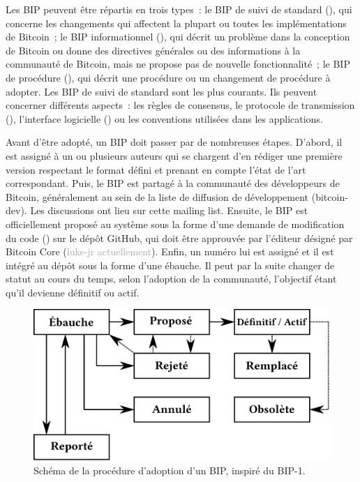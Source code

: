 Les BIP peuvent être répartis en trois types~: le BIP de suivi de standard (), qui concerne les changements qui affectent la plupart ou toutes les implémentations de Bitcoin~; le BIP informationnel (), qui décrit un problème dans la conception de Bitcoin ou donne des directives générales ou des informations à la communauté de Bitcoin, mais ne propose pas de nouvelle fonctionnalité~; le BIP de procédure (), qui décrit une procédure ou un changement de procédure à adopter. Les BIP de suivi de standard sont les plus courants. Ils peuvent concerner différents aspects~: les règles de consensus, le protocole de transmission (), l'interface logicielle () ou les conventions utilisées dans les applications.

Avant d'être adopté, un BIP doit passer par de nombreuses étapes. D'abord, il est assigné à un ou plusieurs auteurs qui se chargent d'en rédiger une première version respectant le format défini et prenant en compte l'état de l'art correspondant. Puis, le BIP est partagé à la communauté des développeurs de Bitcoin, généralement au sein de la liste de diffusion de développement (bitcoin-dev). Les discussions ont lieu sur cette mailing list. Ensuite, le BIP est officiellement proposé au système sous la forme d'une demande de modification du code () sur le dépôt GitHub, qui doit être approuvée par l'éditeur désigné par Bitcoin Core (\textcolor{darkgray}{luke-jr actuellement}). Enfin, un numéro lui est assigné et il est intégré au dépôt sous la forme d'une ébauche. Il peut par la suite changer de statut au cours du temps, selon l'adoption de la communauté, l'objectif étant qu'il devienne définitif ou actif.

\begin{figure}[h]
  \centering
  \includegraphics[scale=0.29]{img/bip-process-fr.eps}
  \caption{Schéma de la procédure d'adoption d'un BIP, inspiré du BIP-1.}
\end{figure}

